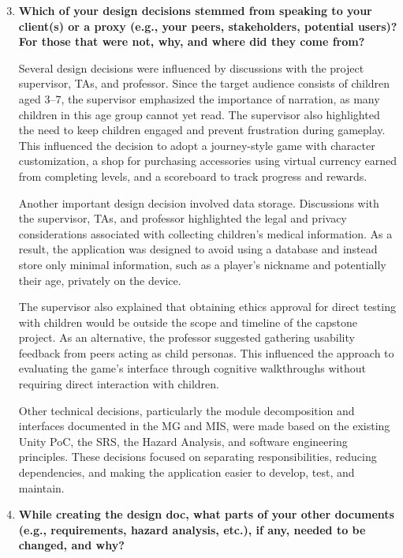 \documentclass[10pt, titlepage]{article}
\begin{document}
\begin{enumerate}
    \setcounter{enumi}{2}

    \item \textbf{Which of your design decisions stemmed from speaking to your
    client(s) or a proxy (e.g., your peers, stakeholders, potential users)?
    For those that were not, why, and where did they come from?}

    Several design decisions were influenced by discussions
    with the project supervisor, TAs, and professor. Since the
    target audience consists of children aged 3--7, the
    supervisor emphasized the importance of narration, as
    many children in this age group cannot yet read. The
    supervisor also highlighted the need to keep children
    engaged and prevent frustration during gameplay. This
    influenced the decision to adopt a journey-style game
    with character customization, a shop for purchasing
    accessories using virtual currency earned from completing
    levels, and a scoreboard to track progress and rewards.

    Another important design decision involved data storage.
    Discussions with the supervisor, TAs, and professor
    highlighted the legal and privacy considerations associated
    with collecting children's medical information. As a
    result, the application was designed to avoid using a
    database and instead store only minimal information,
    such as a player's nickname and potentially their age,
    privately on the device.

    The supervisor also explained that obtaining ethics
    approval for direct testing with children would be
    outside the scope and timeline of the capstone project.
    As an alternative, the professor suggested gathering
    usability feedback from peers acting as child personas.
    This influenced the approach to evaluating the game's
    interface through cognitive walkthroughs without
    requiring direct interaction with children.

    Other technical decisions, particularly the module
    decomposition and interfaces documented in the MG and MIS,
    were made based on the existing Unity PoC, the SRS,
    the Hazard Analysis, and software engineering principles.
    These decisions focused on separating responsibilities,
    reducing dependencies, and making the application easier
    to develop, test, and maintain.


    \item \textbf{While creating the design doc, what parts of your other
    documents (e.g., requirements, hazard analysis, etc.), if any, needed to
    be changed, and why?}


\end{enumerate}
\end{document}
